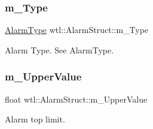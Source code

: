 \subsubsection{\texorpdfstring{m\+\_\+\+Type}{m\_Type}}
{\footnotesize\ttfamily \hyperlink{namespacewtl_ac9fb2a665b6cd51719a16aba276874f2}{Alarm\+Type} wtl\+::\+Alarm\+Struct\+::m\+\_\+\+Type}



Alarm Type. See Alarm\+Type. 

\mbox{\label{structwtl_1_1_alarm_struct_ad1a16ee3022311c4352db1dba8c01be2}} 
\subsubsection{\texorpdfstring{m\+\_\+\+Upper\+Value}{m\_UpperValue}}
{\footnotesize\ttfamily float wtl\+::\+Alarm\+Struct\+::m\+\_\+\+Upper\+Value}



Alarm top limit. 

